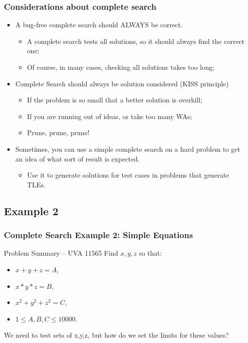\documentclass{beamer}
\begin{document}
\begin{frame}
  \frametitle{Considerations about complete search}
  \begin{itemize}
  \item A bug-free complete search should ALWAYS be correct.\\
    \begin{itemize}
    \item A complete search tests all solutions, so it should always
      find the correct one;
    \item Of course, in many cases, checking all solutions takes too long;
    \end{itemize}

    \bigskip

  \item Complete Search should always be solution considered (KISS
    principle)
    \begin{itemize}
    \item If the problem is so small that a better solution is overkill;
    \item If you are running out of ideas, or take too many WAs;
    \item Prune, prune, prune!
    \end{itemize}
    
    \bigskip

  \item Sometimes, you can use a simple complete search on a hard
    problem to get an idea of what sort of result is expected.
    \begin{itemize}
    \item Use it to generate solutions for test cases in problems that
      generate TLEs.
    \end{itemize}
  \end{itemize}
\end{frame}

\subsection{Example 2}

\begin{frame}
  \frametitle{Complete Search Example 2: Simple Equations}
  \begin{block}{Problem Summary -- UVA 11565}
    Find $x,y,z$ so that:
    \begin{itemize}
    \item $x+y+z=A$,
    \item $x*y*z=B$,
    \item $x^2+y^2+z^2=C$,
    \item $1 \leq A,B,C \leq 10000$.
    \end{itemize}

    \bigskip
  \end{block}

  \vfill

  We need to test sets of x,y,z, but how do we set the limits for
  these values?
\end{frame}
\end{document}
